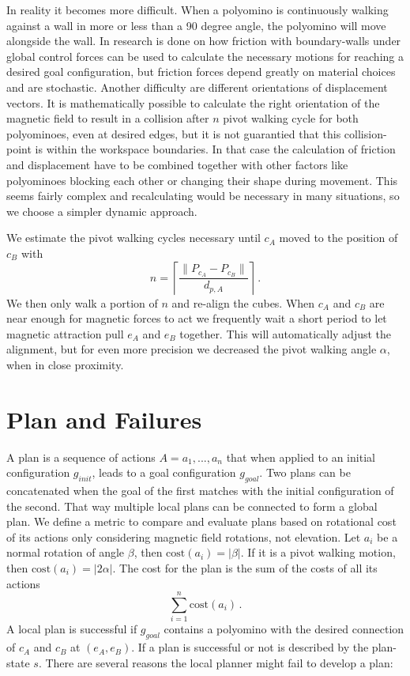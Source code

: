 In reality it becomes more difficult.
When a polyomino is continuously walking against a wall in more or less than a 90 degree angle, the polyomino will move alongside the wall.
In \cite{schmidt2020} research is done on how friction with boundary-walls under global control forces can be used to calculate the necessary motions for reaching a desired goal configuration, but friction forces depend greatly on material choices and are stochastic.
Another difficulty are different orientations of displacement vectors.
It is mathematically possible to calculate the right orientation of the magnetic field to result in a collision after $n$ pivot walking cycle for both polyominoes, even at desired edges, but it is not guarantied that this collision-point is within the workspace boundaries.
In that case the calculation of friction and displacement have to be combined together with other factors like polyominoes blocking each other or changing their shape during movement.
This seems fairly complex and recalculating would be necessary in many situations, so we choose a simpler dynamic approach.

We estimate the pivot walking cycles necessary until $c_A$ moved to the position of $c_B$ with
\begin{equation}
n = \left\lceil \frac{\lVert P_{c_A} - P_{c_B}\rVert}{d_{p,A}} \right\rceil \,.
\end{equation}
We then only walk a portion of $n$ and re-align the cubes.
When $c_A$ and $c_B$ are near enough for magnetic forces to act we frequently wait a short period to let magnetic attraction pull $e_A$ and $e_B$ together.
This will automatically adjust the alignment, but for even more precision we decreased the pivot walking angle $\alpha$, when in close proximity.

\section{Plan and Failures}
\label{sec:plan}

A plan is a sequence of actions $A = a_1, ... , a_n$ that when applied to an initial configuration $g_{init}$, leads to a goal configuration $g_{goal}$.
Two plans can be concatenated when the goal of the first matches with the initial configuration of the second.
That way multiple local plans can be connected to form a global plan.
We define a metric to compare and evaluate plans based on rotational cost of its actions only considering magnetic field rotations, not elevation.
Let $a_i$ be a normal rotation of angle $\beta$, then $\text{cost}(a_i) = |\beta|$.
If it is a pivot walking motion, then $\text{cost}(a_i) = |2\alpha|$.
The cost for the plan is the sum of the costs of all its actions
\begin{equation}
\sum_{i=1}^{n} \text{cost}(a_i) \,.
\end{equation}
A local plan is successful if $g_{goal}$ contains a polyomino with the desired connection of $c_A$ and $c_B$ at $(e_A, e_B)$.
If a plan is successful or not is described by the plan-state $s$.
There are several reasons the local planner might fail to develop a plan:

